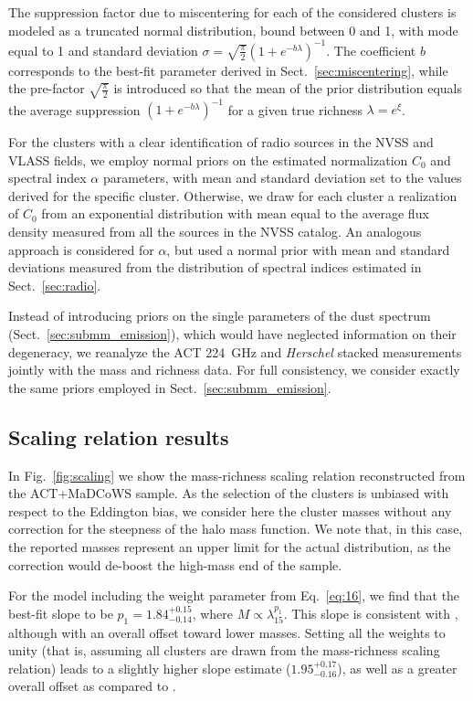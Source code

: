 \documentclass[longauth]{aa} %
\begin{document}
The suppression factor due to miscentering for each of the considered clusters is modeled as a truncated normal distribution, bound between 0 and 1, with mode equal to 1 and standard deviation $\sigma=\sqrt{\frac{\pi}{2}}(1+e^{-b\lambda})^{-1}$. The coefficient $b$ corresponds to the best-fit parameter derived in Sect.~\ref{sec:miscentering}, while the pre-factor $\sqrt{\frac{\pi}{2}}$ is introduced so that the mean of the prior distribution equals the average suppression $(1+e^{-b\lambda})^{-1}$ for a given true richness $\lambda=e^\xi$.

For the clusters with a clear identification of radio sources in the NVSS and VLASS fields, we employ normal priors on the estimated normalization $C_0$ and spectral index $\alpha$ parameters, with mean and standard deviation set to the values derived for the specific cluster. Otherwise, we draw for each cluster a realization of $C_0$ from an exponential distribution with mean equal to the average flux density measured from all the sources in the NVSS catalog. An analogous approach is considered for $\alpha$, but used a normal prior with mean and standard deviations measured from the distribution of spectral indices estimated in Sect.~\ref{sec:radio}.

Instead of introducing priors on the single parameters of the dust spectrum (Sect.~\ref{sec:submm_emission}), which would have neglected information on their degeneracy, we reanalyze the ACT 224~GHz and {\it Herschel} stacked measurements jointly with the mass and richness data. For full consistency, we consider exactly the same priors employed in Sect.~\ref{sec:submm_emission}.

\subsection{Scaling relation results}\label{sec:scaling_results}

In Fig.~\ref{fig:scaling} we show the mass-richness scaling relation reconstructed from the ACT+MaDCoWS sample. As the selection of the clusters is unbiased with respect to the Eddington bias, we consider here the cluster masses without any correction for the steepness of the halo mass function. We note that, in this case, the reported masses represent an upper limit for the actual distribution, as the correction would de-boost the high-mass end of the sample.

For the model including the weight parameter from Eq.~\ref{eq:16}, we find that the best-fit slope to be $p_1 = 1.84^{+0.15}_{-0.14}$, where $M\propto \lambda_{15}^{p_1}$. This slope is consistent with \citet{Gonzalez2019}, although with an overall offset toward lower masses. Setting all the weights to unity (that is,  assuming all clusters are drawn from the mass-richness scaling relation) leads to a slightly higher slope estimate ($1.95^{+0.17}_{-0.16}$), as well as a greater overall offset as compared to \citet{Gonzalez2019}. 
\end{document}
